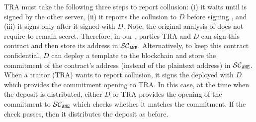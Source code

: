 TRA must take the following three steps to report collusion: (i) it waits until \SCcc is signed by the other server, (ii) it reports the collusion to $ { D}$ before signing \SCcc, and (iii) it signs \SCcc only after it signed \SCtc with $ { D}$. Note, the original analysis of \SCtc does not require \SCtc to remain secret. Therefore, in our  \epsi, parties TRA and $ { D}$ can sign this contract and   then store its address in $\mathcal{SC}_{\mathtt{ANE}}$. Alternatively, to keep this contract confidential, $ { D}$ can deploy a template \SCtc to the blockchain and store the commitment of the contract's address (instead of the plaintext address) in $\mathcal{SC}_{\mathtt{ANE}}$. When a traitor (TRA) wants to report collusion, it signs the deployed \SCtc with  $ { D}$ which provides the commitment opening to TRA. In this case, at the time when the deposit is distributed,   either $ { D}$ or TRA   provides the opening of the commitment to  $\mathcal{SC}_{\mathtt{ANE}}$ which checks whether it matches the commitment. If the check passes, then it distributes the deposit as before. 

































